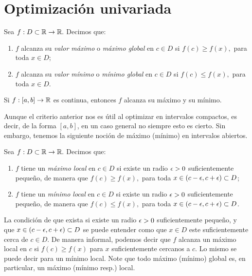 
\section{Optimización univariada}


    \begin{defn} Sea $f:D\subset \mathbb{R} \to \mathbb{R}.$ Decimos que:
        \begin{enumerate}
            \item $f$ alcanza su \emph{valor máximo} o \emph{máximo global} en $c\in D$ si $f(c)\geq f(x),$ para toda $x\in D$;
            \item $f$ alcanza su \emph{valor mínimo} o \emph{mínimo global} en $c\in D$ si $f(c)\leq f(x),$ para toda $x\in D$.
        \end{enumerate}
        
    \end{defn}


    \begin{thm}
        Si $f:[a,b]\to \mathbb{R}$ es continua, entonces $f$ alcanza su máximo y su mínimo.
    \end{thm}


    Aunque el criterio anterior nos es útil al optimizar en intervalos compactos, es decir, de la forma $[a,b]$, en un caso
    general no siempre esto es cierto. Sin embargo, tenemos la siguiente noción de máximo (mínimo) en intervalos abiertos.


    \begin{defn} Sea $f:D\subset \mathbb{R} \to \mathbb{R}.$ Decimos que:
        \begin{enumerate}
            \item $f$ tiene un \emph{máximo local} en $c\in D$ si existe un radio $\epsilon>0$ suficientemente pequeño, de
            manera que $f(c)\geq f(x),$ para toda $x\in (c-\epsilon,c+\epsilon)\subset D$;
            \item $f$ tiene un \emph{mínimo local} en $c\in D$ si existe un radio $\epsilon>0$ suficientemente pequeño, de
            manera que $f(c)\leq f(x),$ para toda $x\in (c-\epsilon,c+\epsilon)\subset D$.
        \end{enumerate}
        
    \end{defn}


    \begin{rem}
        La condición de que exista si existe un radio $\epsilon>0$ suficientemente pequeño, y que $x\in (c-\epsilon,c+\epsilon)\subset D$ se
        puede entender como que $x\in D$ este suficientemente cerca de $c\in D.$ De manera informal, podemos decir que $f$
        alcanza un máximo local en $c$ si $f(c)\geq f(x)$ para $x$ suficientemente cercanos a $c.$ Lo mismo se puede decir para
        un mínimo local. Note que todo máximo (mínimo) global es, en particular, un máximo (mínimo resp.) local.
    \end{rem}


